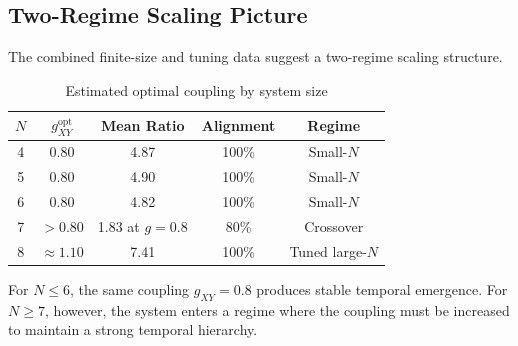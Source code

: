 \documentclass[12pt,a4paper]{article}
\begin{document}
\subsection{Two-Regime Scaling Picture}\label{sec:two_regime_scaling}

The combined finite-size and tuning data suggest a two-regime scaling
structure.

\begin{table}[ht]
\centering
\caption{Estimated optimal coupling by system size}
\label{tab:gopt_scaling}
\begin{tabular}{ccccc}
\toprule
$N$ & $g_{XY}^{\mathrm{opt}}$ & Mean Ratio & Alignment & Regime \\
\midrule
4 & 0.80 & 4.87 & 100\% & Small-$N$ \\
5 & 0.80 & 4.90 & 100\% & Small-$N$ \\
6 & 0.80 & 4.82 & 100\% & Small-$N$ \\
7 & $>0.80$ & 1.83 at $g=0.8$ & 80\% & Crossover \\
8 & $\approx 1.10$ & 7.41 & 100\% & Tuned large-$N$ \\
\bottomrule
\end{tabular}
\end{table}

For $N \leq 6$, the same coupling $g_{XY}=0.8$ produces stable temporal
emergence. For $N \geq 7$, however, the system enters a regime where the
coupling must be increased to maintain a strong temporal hierarchy.
\end{document}
